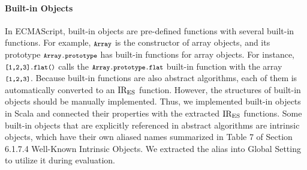 \paragraph{Built-in Objects}
In ECMAScript, built-in objects are pre-defined functions with several
built-in functions.  For example, \( \texttt{\footnotesize Array} \)
is the constructor of array objects, and its prototype
\( \texttt{\footnotesize Array.prototype} \) has built-in functions for array objects.
For instance, \( \texttt{\footnotesize[1,2,3].flat()} \) calls the
\( \texttt{\footnotesize Array.prototype.flat} \) built-in function with the array
\( \texttt{\footnotesize[1,2,3]} \).  Because built-in functions are also abstract
algorithms, each of them is automatically converted to an \( \text{IR}_\text{ES} \)
function.  However, the structures of built-in objects should be
manually implemented.  Thus, we implemented built-in objects in Scala
and connected their properties with the extracted \( \text{IR}_\text{ES} \) functions.
%
Some built-in objects that are explicitly referenced in abstract
algorithms are intrinsic objects, which have their own
aliased names summarized in Table 7 of Section 6.1.7.4
\textsf{Well-Known Intrinsic Objects}.  We extracted the alias
into \textsf{Global Setting} to utilize it during evaluation.
